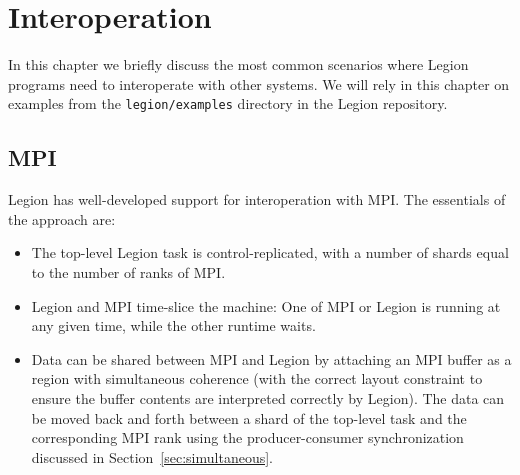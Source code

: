 \chapter{Interoperation}
\label{chap:interop}

In this chapter we briefly discuss the most common scenarios where Legion programs need to interoperate with other systems.  We will rely in this chapter on examples from the {\tt legion/examples} directory in the Legion repository.

\section{MPI}
\label{sec:mpi}

Legion has well-developed support for interoperation with MPI.  The essentials of the approach are:
\begin{itemize}
\item The top-level Legion task is control-replicated, with a number of shards equal to the number of ranks of MPI.
\item Legion and MPI time-slice the machine:  One of MPI or Legion is running at any given time, while the other runtime
  waits.
\item Data can be shared between MPI and Legion by attaching an MPI buffer as a region with simultaneous coherence (with the correct layout constraint
  to ensure the buffer contents are interpreted correctly by Legion).  The data can be moved back and forth between a shard of the top-level
  task and the corresponding MPI rank using the producer-consumer synchronization discussed in Section~\ref{sec:simultaneous}.
\end{itemize}

